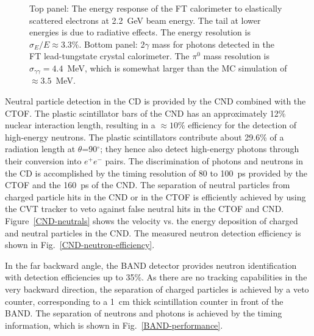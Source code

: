 \documentclass[final,3p,twocolumn]{elsarticle}
\begin{document}
\begin{figure}[t!]
\caption{Top panel: The energy response of the FT calorimeter to elastically scattered electrons at 2.2~GeV
  beam energy. The tail at lower energies is due to radiative effects. The energy resolution is
  $\sigma_E / E \approx 3.3\%$. Bottom panel: 2$\gamma$ mass for photons detected in the FT lead-tungstate
  crystal calorimeter. The $\pi^0$ mass resolution is $\sigma_{\gamma\gamma} = 4.4$~MeV, which is somewhat 
  larger than the MC simulation of $\approx 3.5$~MeV. }
\label{FT-en-gg}
\end{figure}

Neutral particle detection in the CD is provided by the CND combined with the CTOF. The plastic scintillator bars
of the CND has an approximately 12\% nuclear interaction length, resulting in a $\approx 10\%$ efficiency for
the detection of high-energy neutrons. The plastic scintillators contribute about 29.6\% of a radiation length at
$\theta$=90$^\circ$; they hence also detect high-energy photons through their conversion into $e^+e^-$ pairs. The
discrimination of photons and neutrons in the CD is accomplished by the timing resolution of 80 to 100~ps provided by the
CTOF and the 160~ps of the CND. The separation of neutral particles from charged particle hits in the CND or in
the CTOF is efficiently achieved by using the CVT tracker to veto against false neutral hits in the CTOF and CND.
Figure~\ref{CND-neutrals} shows the velocity vs. the energy deposition of charged and neutral particles in the
CND. The measured neutron detection efficiency is shown in Fig.~\ref{CND-neutron-efficiency}.

In the far backward angle, the BAND detector provides neutron identification with detection efficiencies up to 35\%. As there 
are no tracking capabilities in the very backward direction, the separation of charged particles is achieved by a veto counter,
corresponding to a 1~cm thick scintillation counter in front of the BAND. The separation of neutrons and photons is achieved 
by the timing information, which is shown in Fig.~\ref{BAND-performance}.   

  
\end{document}
